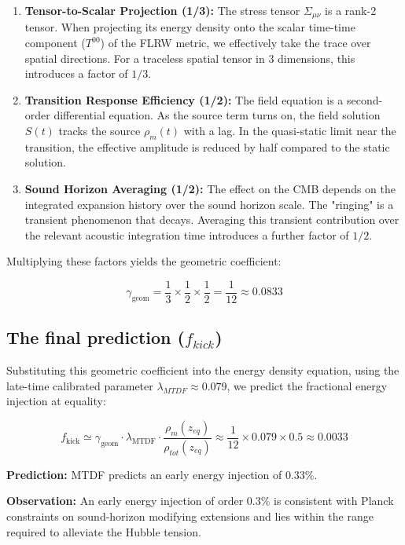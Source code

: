 \documentclass[11pt,a4paper]{article}
\begin{document}
\begin{enumerate}
  \item \textbf{Tensor-to-Scalar Projection (1/\allowbreak{}3):} The stress tensor $\Sigma_{\mu\nu}$ is a rank-2 tensor. When projecting its energy density onto the scalar time-time component ($T^{00}$) of the FLRW metric, we effectively take the trace over spatial directions. For a traceless spatial tensor in 3 dimensions, this introduces a factor of $1/3$.
  \item \textbf{Transition Response Efficiency (1/\allowbreak{}2):} The field equation is a second-order differential equation. As the source term turns on, the field solution $S(t)$ tracks the source $\rho_m(t)$ with a lag. In the quasi-static limit near the transition, the effective amplitude is reduced by half compared to the static solution.
  \item \textbf{Sound Horizon Averaging (1/\allowbreak{}2):} The effect on the CMB depends on the integrated expansion history over the sound horizon scale. The "ringing" is a transient phenomenon that decays. Averaging this transient contribution over the relevant acoustic integration time introduces a further factor of $1/2$.
\end{enumerate}

Multiplying these factors yields the geometric coefficient:

$$ \gamma_{\text{geom}} = \frac{1}{3} \times \frac{1}{2} \times \frac{1}{2} = \frac{1}{12} \approx 0.0833 $$

\subsection{The final prediction ($f_{kick}$)}
Substituting this geometric coefficient into the energy density equation, using the late-time calibrated parameter $\lambda_{MTDF} \approx 0.079$, we predict the fractional energy injection at equality:

$$ f_{\text{kick}} \simeq \gamma_{\text{geom}} \cdot \lambda_{\text{MTDF}} \cdot \frac{\rho_m(z_{eq})}{\rho_{tot}(z_{eq})} \approx \frac{1}{12} \times 0.079 \times 0.5 \approx 0.0033 $$

\textbf{Prediction:} MTDF predicts an early energy injection of $\mathbf{0.33\%}$.

\textbf{Observation:} An early energy injection of order $0.3\%$ is consistent with Planck constraints on sound-horizon modifying extensions and lies within the range required to alleviate the Hubble tension.
\end{document}
